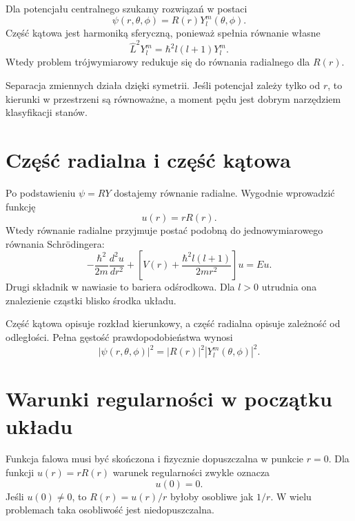Dla potencjału centralnego szukamy rozwiązań w postaci
\begin{equation}
    \psi(r,\theta,\phi)=R(r)Y_l^m(\theta,\phi).
\end{equation}
Część kątowa jest harmoniką sferyczną, ponieważ spełnia równanie własne
\begin{equation}
    \hat{L}^2Y_l^m=\hbar^2l(l+1)Y_l^m.
\end{equation}
Wtedy problem trójwymiarowy redukuje się do równania radialnego dla \(R(r)\).

Separacja zmiennych działa dzięki symetrii. Jeśli potencjał zależy tylko od \(r\), to kierunki w przestrzeni są równoważne, a moment pędu jest dobrym narzędziem klasyfikacji stanów.

\section{Część radialna i część kątowa}

Po podstawieniu \(\psi=RY\) dostajemy równanie radialne. Wygodnie wprowadzić funkcję
\begin{equation}
    u(r)=rR(r).
\end{equation}
Wtedy równanie radialne przyjmuje postać podobną do jednowymiarowego równania Schrödingera:
\begin{equation}
    -\frac{\hbar^2}{2m}\frac{d^2u}{dr^2}
    +\left[V(r)+\frac{\hbar^2l(l+1)}{2mr^2}\right]u=Eu.
\end{equation}
Drugi składnik w nawiasie to bariera odśrodkowa. Dla \(l>0\) utrudnia ona znalezienie cząstki blisko środka układu.

Część kątowa opisuje rozkład kierunkowy, a część radialna opisuje zależność od odległości. Pełna gęstość prawdopodobieństwa wynosi
\begin{equation}
    |\psi(r,\theta,\phi)|^2=|R(r)|^2|Y_l^m(\theta,\phi)|^2.
\end{equation}

\section{Warunki regularności w początku układu}

Funkcja falowa musi być skończona i fizycznie dopuszczalna w punkcie \(r=0\). Dla funkcji \(u(r)=rR(r)\) warunek regularności zwykle oznacza
\begin{equation}
    u(0)=0.
\end{equation}
Jeśli \(u(0)\neq0\), to \(R(r)=u(r)/r\) byłoby osobliwe jak \(1/r\). W wielu problemach taka osobliwość jest niedopuszczalna.

